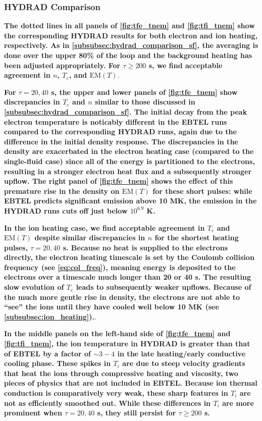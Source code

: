 \documentclass[iop]{emulateapj}
\begin{document}
	\subsubsection{HYDRAD Comparison}
	\label{subsubsec:hydrad_comparison_tf}
	\par\textbf{The dotted lines in all panels of \autoref{fig:tfe_tnem} and \autoref{fig:tfi_tnem} show the corresponding HYDRAD results for both electron and ion heating, respectively. As in \autoref{subsubsec:hydrad_comparison_sf}, the averaging is done over the upper 80\% of the loop and the background heating has been adjusted appropriately. For $\tau\ge200$ s, we find acceptable agreement in $n$, $T_e$, and $\mathrm{EM}(T)$}.
	\par\textbf{For $\tau=20,40$ s, the upper and lower panels of \autoref{fig:tfe_tnem} show discrepancies in $T_e$ and $n$ similar to those discussed in \autoref{subsubsec:hydrad_comparison_sf}. The initial decay from the peak electron temperature is noticably different in the EBTEL runs compared to the corresponding HYDRAD runs, again due to the difference in the initial density response. The discrepancies in the density are exacerbated in the electron heating case (compared to the single-fluid case) since all of the energy is partitioned to the electrons, resulting in a stronger electron heat flux and a subsequently stronger upflow. The right panel of \autoref{fig:tfe_tnem} shows the effect of this premature rise in the density on $\mathrm{EM}(T)$ for these short pulses: while EBTEL predicts significant emission above 10 MK, the emission in the HYDRAD runs cuts off just below $10^{6.9}$ K.} 
	\par\textbf{In the ion heating case, we find acceptable agreement in $T_e$ and $\mathrm{EM}(T)$ despite similar discrepancies in $n$ for the shortest heating pulses, $\tau=20,40$ s. Because no heat is supplied to the electrons directly, the electron heating timescale is set by the Coulomb collision frequency (see \autoref{eq:col_freq}), meaning energy is deposited to the electrons over a timescale much longer than 20 or 40 s. The resulting slow evolution of $T_e$ leads to subsequently weaker upflows. Because of the much more gentle rise in density, the electrons are not able to ``see'' the ions until they have cooled well below 10 MK (see \autoref{subsubsec:ion_heating}).}.
	\par\textbf{In the middle panels on the left-hand side of \autoref{fig:tfe_tnem} and \autoref{fig:tfi_tnem}, the ion temperature in HYDRAD is greater than that of EBTEL by a factor of $\sim3-4$ in the late heating/early conductive cooling phase. These spikes in $T_i$ are due to steep velocity gradients that heat the ions through compressive heating and viscosity, two pieces of physics that are not included in EBTEL. Because ion thermal conduction is comparatively very weak, these sharp features in $T_i$ are not as efficiently smoothed out. While these differences in $T_i$ are more prominent when $\tau=20,40$ s, they still persist for $\tau\ge200$ s.}
\end{document}
